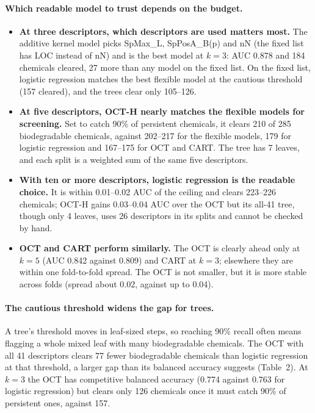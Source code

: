 \documentclass[11pt]{article}
\begin{document}
\paragraph{Which readable model to trust depends on the budget.}
\begin{itemize}
  \item \textbf{At three descriptors, which descriptors are used matters most.} The additive kernel
        model picks SpMax\_L, SpPosA\_B(p) and nN (the fixed list has LOC instead of nN) and is the
        best model at $k=3$: AUC 0.878 and 184 chemicals cleared, 27 more than any model on the
        fixed list. On the fixed list, logistic regression matches the best flexible model at the
        cautious threshold (157 cleared), and the trees clear only 105--126.
  \item \textbf{At five descriptors, OCT-H nearly matches the flexible models for screening.} Set to
        catch 90\% of persistent chemicals, it clears 210 of 285 biodegradable chemicals, against
        202--217 for the flexible models, 179 for logistic regression and 167--175 for OCT and CART.
        The tree has 7 leaves, and each split is a weighted sum of the same five descriptors.
  \item \textbf{With ten or more descriptors, logistic regression is the readable choice.} It is
        within 0.01--0.02 AUC of the ceiling and clears 223--226 chemicals; OCT-H gains 0.03--0.04
        AUC over the OCT but its all-41 tree, though only 4 leaves, uses 26 descriptors in its splits
        and cannot be checked by hand.
  \item \textbf{OCT and CART perform similarly.} The OCT is clearly ahead only at $k=5$ (AUC 0.842
        against 0.809) and CART at $k=3$; elsewhere they are within one fold-to-fold spread. The OCT
        is not smaller, but it is more stable across folds (spread about 0.02, against up to 0.04).
\end{itemize}

\paragraph{The cautious threshold widens the gap for trees.} A tree's threshold moves in
leaf-sized steps, so reaching 90\% recall often means flagging a whole mixed leaf with many
biodegradable chemicals. The OCT with all 41 descriptors clears 77 fewer biodegradable chemicals
than logistic regression at that threshold, a larger gap than its balanced accuracy suggests
(Table~2). At $k=3$ the OCT has competitive balanced accuracy (0.774 against 0.763 for logistic
regression) but clears only 126 chemicals once it must catch 90\% of persistent ones, against 157.
\end{document}
